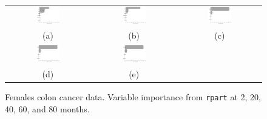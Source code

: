 \documentclass[12pt]{article}
\begin{document}
\begin{figure}[h!]
\centering
\begin{tabular}{c c c}
\includegraphics[width=0.3\textwidth]{rpartvimp1_females.pdf} & 
\includegraphics[width=0.3\textwidth]{rpartvimp10_females.pdf} & 
\includegraphics[width=0.3\textwidth]{rpartvimp20_females.pdf}\\
 (a) & (b) & (c) \\
 \includegraphics[width=0.3\textwidth]{rpartvimp30_females.pdf} & 
\includegraphics[width=0.3\textwidth]{rpartvimp40_females.pdf} & 
\\
 (d) & (e) & 
 \end{tabular}
\caption{ Females colon cancer data. Variable importance from \texttt{rpart} at 2, 20, 40, 60, and 80 months.}
\label{fig:rpartvimp_females}
\end{figure}


\end{document}
